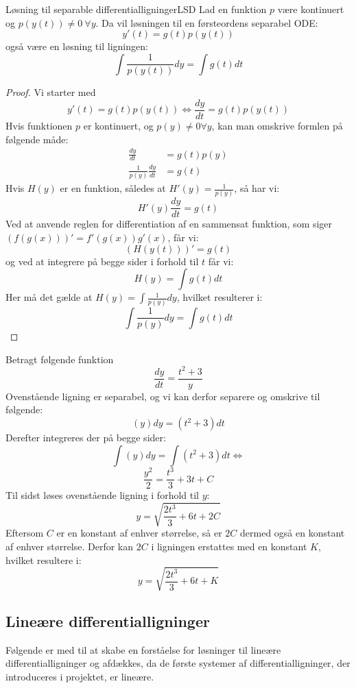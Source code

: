 \begin{mytheo}{Løsning til separable differentialligninger}{LSD}
Lad en funktion $p$ være kontinuert og $p(y(t)) \neq 0 \ \forall y$. Da vil løsningen til en førsteordens separabel ODE:
$$y'(t)=g(t)p(y(t))$$
også være en løsning til ligningen: 
$$\int \frac{1}{p(y(t))}dy=\int g(t)dt$$
\end{mytheo}

\begin{proof}\hfill \break
Vi starter med $$y'(t)=g(t)p(y(t))\Longleftrightarrow \frac{dy}{dt} = g(t)p(y(t))$$
Hvis funktionen $p$ er kontinuert, og $p(y)\neq 0 \forall y$, kan man omskrive formlen på følgende måde:
\begin{align*}
    \frac{dy}{dt} &= g(t)p(y)\\
    \frac{1}{p(y)}\frac{dy}{dt} &= g(t)
\end{align*}
Hvis $H(y)$ er en funktion, således at $H'(y)=\frac{1}{p(y)}$, så har vi: $$H'(y) \frac{dy}{dt}=g(t)$$
Ved at anvende reglen for differentiation af en sammensat funktion, som siger $(f(g(x)))'=f'(g(x))g'(x)$, får vi:
$$(H(y(t)))'=g(t)$$
og ved at integrere på begge sider i forhold til $t$ får vi:
$$H(y)=\int g(t) dt$$
Her må det gælde at $H(y)=\int \frac{1}{p(y)}dy$, hvilket resulterer i: $$\int \frac{1}{p(y)}dy=\int g(t) dt$$
\end{proof}

\begin{Example}\hfill \break
\textnormal{Betragt følgende funktion} $$\frac{dy}{dt}=\frac{t^2+3}{y}$$ \textnormal{Ovenstående ligning er separabel, og vi kan derfor separere og omskrive til følgende:} $$(y)dy=(t^2+3)dt$$ \textnormal{Derefter integreres der på begge sider:} $$\int (y)dy=\int (t^2+3)dt\Leftrightarrow$$ $$\frac{y^2}{2}=\frac{t^3}{3}+3t+C$$ \textnormal{Til sidst løses ovenstående ligning i forhold til} $y$:$$y=\sqrt{\frac{2t^3}{3}+6t+2C}$$ \textnormal{Eftersom $C$ er en konstant af enhver størrelse, så er $2C$ dermed også en konstant af enhver størrelse. Derfor kan $2C$ i ligningen erstattes med en konstant $K$, hvilket resultere i:} $$y=\sqrt{\frac{2t^3}{3}+6t+K}$$
\end{Example}

\subsection{Lineære differentialligninger}
Følgende er med til at skabe en forståelse for løsninger til lineære differentialligninger og afdækkes, da de første systemer af differentialligninger, der introduceres i projektet, er lineære.
\hfill \break


